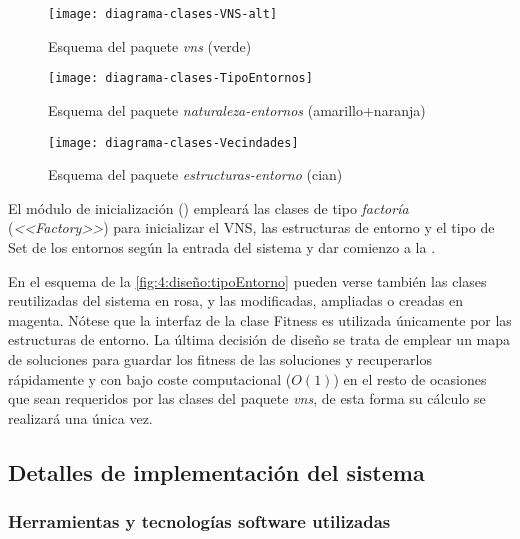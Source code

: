 \begin{figure}[htbp]
	\centering
	\texttt{[image: diagrama-clases-VNS-alt]}
	\caption{Esquema del paquete \textit{vns} (verde)}
	\label{fig:4:diseño:vns}
\end{figure}

\begin{figure}[htbp]
	\centering
	\texttt{[image: diagrama-clases-TipoEntornos]}
	\caption{Esquema del paquete \textit{naturaleza-entornos} (amarillo+naranja)}
	\label{fig:4:diseño:tipoEntorno}
\end{figure}

\begin{figure}[htbp]
	\centering
	\texttt{[image: diagrama-clases-Vecindades]}
	\caption{Esquema del paquete \textit{estructuras-entorno} (cian)}
	\label{fig:4:diseño:entornos}
\end{figure}

El módulo de inicialización (\faseuno{}) empleará las clases de tipo \textit{factoría} (\textit{<<Factory>>}) para inicializar el VNS, las estructuras de entorno y el tipo de Set de los entornos según la entrada del sistema y dar comienzo a la \faseuno{}.

En el esquema de la \autoref{fig:4:diseño:tipoEntorno} pueden verse también las clases reutilizadas del sistema \legacy{} en rosa, y las modificadas, ampliadas o creadas en magenta. Nótese que la interfaz de la clase Fitness es utilizada únicamente por las estructuras de entorno. La última decisión de diseño se trata de emplear un mapa de soluciones para guardar los fitness de las soluciones y recuperarlos rápidamente y con bajo coste computacional ($O(1)$) en el resto de ocasiones que sean requeridos por las clases del paquete \textit{vns}, de esta forma su cálculo se realizará una única vez.


\subsection{Detalles de implementación del sistema}
\label{sec:4:implementacion}

\subsubsection{Herramientas y tecnologías software utilizadas}

